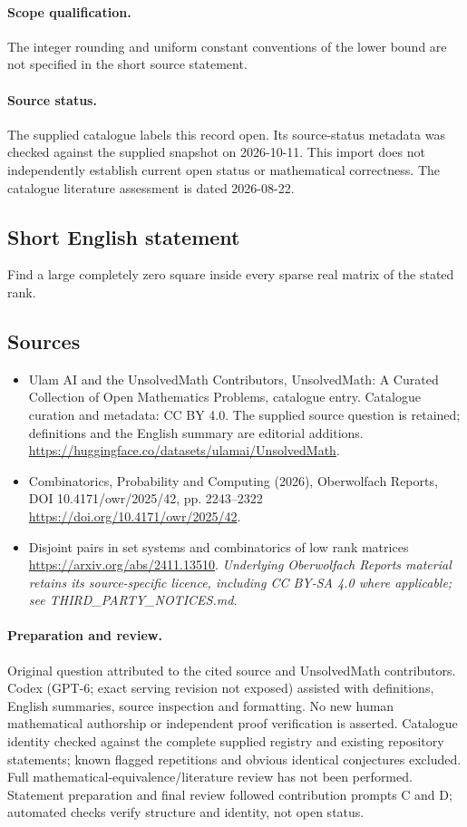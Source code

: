 \documentclass[11pt]{article}
\begin{document}
\paragraph{Scope qualification.}
The integer rounding and uniform constant conventions of the lower bound are not specified in the short source statement.
\paragraph{Source status.}
The supplied catalogue labels this record open. Its source-status metadata was checked against the supplied snapshot on 2026-10-11. This import does not independently establish current open status or mathematical correctness. The catalogue literature assessment is dated 2026-08-22.
\subsection{Short English statement}
Find a large completely zero square inside every sparse real matrix of the stated rank.
\subsection{Sources}
\begin{itemize}
\item[S1] Ulam AI and the UnsolvedMath Contributors, UnsolvedMath: A Curated Collection of Open Mathematics Problems, catalogue entry. Catalogue curation and metadata: CC BY 4.0. The supplied source question is retained; definitions and the English summary are editorial additions.
\url{https://huggingface.co/datasets/ulamai/UnsolvedMath}.
\item[S2] Combinatorics, Probability and Computing (2026), Oberwolfach Reports, DOI 10.4171/owr/2025/42, pp. 2243--2322
\url{https://doi.org/10.4171/owr/2025/42}.
\item[S3] Disjoint pairs in set systems and combinatorics of low rank matrices
\url{https://arxiv.org/abs/2411.13510}.
\textit{Underlying Oberwolfach Reports material retains its source-specific licence, including CC BY-SA 4.0 where applicable; see THIRD\_PARTY\_NOTICES.md.}
\end{itemize}
\paragraph{Preparation and review.}
Original question attributed to the cited source and UnsolvedMath contributors. Codex (GPT-6; exact serving revision not exposed) assisted with definitions, English summaries, source inspection and formatting. No new human mathematical authorship or independent proof verification is asserted. Catalogue identity checked against the complete supplied registry and existing repository statements; known flagged repetitions and obvious identical conjectures excluded. Full mathematical-equivalence/literature review has not been performed. Statement preparation and final review followed contribution prompts C and D; automated checks verify structure and identity, not open status.
\label{end:statement}
\end{document}
